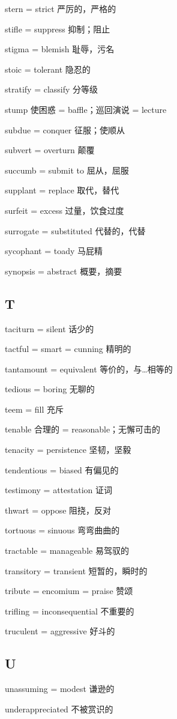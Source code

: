\documentclass[UTF8, fontset = none, zihao = -4, linespread = 1.1]{ctexart}
\begin{document}
\begin{multicols}{2}
stern = strict 严厉的，严格的

stifle = suppress 抑制；阻止

stigma = blemish 耻辱，污名

stoic = tolerant 隐忍的

stratify = classify 分等级

stump 使困惑 = baffle；巡回演说 = lecture

subdue = conquer 征服；使顺从

subvert = overturn 颠覆

succumb = submit to 屈从，屈服

supplant = replace 取代，替代

surfeit = excess 过量，饮食过度

surrogate = substituted 代替的，代替

sycophant = toady 马屁精

synopsis = abstract 概要，摘要

\subsection*{T}
taciturn = silent 话少的

tactful = smart = cunning 精明的

tantamount = equivalent 等价的，与…相等的

tedious = boring 无聊的

teem = fill 充斥

tenable 合理的 = reasonable；无懈可击的

tenacity = persistence 坚韧，坚毅

tendentious = biased 有偏见的

testimony = attestation 证词

thwart = oppose 阻挠，反对

tortuous = sinuous 弯弯曲曲的

tractable = manageable 易驾驭的

transitory = transient 短暂的，瞬时的

tribute = encomium = praise 赞颂

trifling = inconsequential 不重要的

truculent = aggressive 好斗的

\subsection*{U}
unassuming = modest 谦逊的

underappreciated 不被赏识的


\end{multicols}
\end{document}
